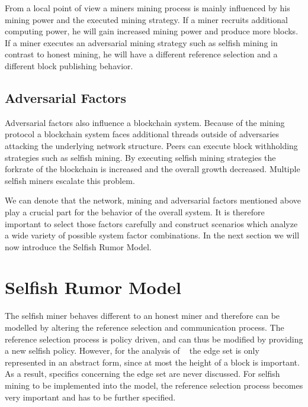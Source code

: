 From a local point of view a miners mining process is mainly influenced by his mining power and the executed mining strategy. If a miner recruits additional computing power, he will gain increased mining power and produce more blocks. If a miner executes an adversarial mining strategy such as selfish mining in contrast to honest mining, he will have a different reference selection and a different block publishing behavior.

\subsection{Adversarial Factors}
Adversarial factors also influence a blockchain system. Because of the mining protocol a blockchain system faces additional threads outside of adversaries attacking the underlying network structure. Peers can execute block withholding strategies such as selfish mining. By executing selfish mining strategies the forkrate of the blockchain is increased and the overall growth decreased. Multiple selfish miners escalate this problem.


We can denote that the network, mining and adversarial factors mentioned above play a crucial part for the behavior of the overall system. It is therefore important to select those factors carefully and construct scenarios which analyze a wide variety of possible system factor combinations. In the next section we will now introduce the Selfish Rumor Model.

\section{Selfish Rumor Model}\label{selfishmodel}
The selfish miner behaves different to an honest miner and therefore can be modelled by altering the reference selection and communication process. The reference selection process is policy driven, and can thus be modified by providing a new selfish policy. However, for the analysis of \gopalan~ the edge set is only represented in an abstract form, since at most the height of a block is important. As a result, specifics concerning the edge set are never discussed. For selfish mining to be implemented into the model, the reference selection process becomes very important and has to be further specified.
